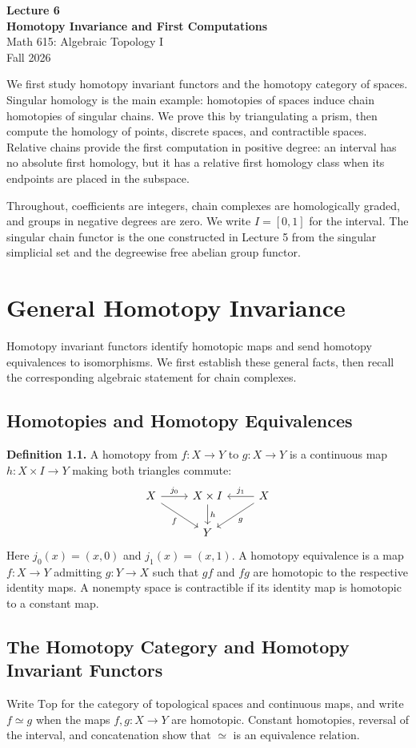 \documentclass[11pt]{article}
\newcommand{\facehead}[1]{\par\Needspace{4\baselineskip}\subsection{#1}}
\begin{document}
\begin{center}
{\Large\bfseries Lecture 6}\\[4pt]
{\LARGE\bfseries Homotopy Invariance and First Computations}\\[6pt]
Math 615: Algebraic Topology I\\Fall 2026
\end{center}
We first study homotopy invariant functors and the homotopy category of spaces. Singular homology is the main example: homotopies of spaces induce chain homotopies of singular chains. We prove this by triangulating a prism, then compute the homology of points, discrete spaces, and contractible spaces. Relative chains provide the first computation in positive degree: an interval has no absolute first homology, but it has a relative first homology class when its endpoints are placed in the subspace.

Throughout, coefficients are integers, chain complexes are homologically graded, and groups in negative degrees are zero. We write $I=[0,1]$ for the interval. The singular chain functor is the one constructed in Lecture 5 from the singular simplicial set and the degreewise free abelian group functor.
{\setlength{\parskip}{0pt}\small\tableofcontents}
\section{General Homotopy Invariance}\label{sec:definitions}
Homotopy invariant functors identify homotopic maps and send homotopy equivalences to isomorphisms. We first establish these general facts, then recall the corresponding algebraic statement for chain complexes.

\facehead{Homotopies and Homotopy Equivalences}
\textbf{Definition 1.1.} A homotopy from $f:X\to Y$ to $g:X\to Y$ is a continuous map $h:X\times I\to Y$ making both triangles commute:
\[
\begin{tikzcd}
X \arrow[r,"j_0"] \arrow[dr,"f"'] & X\times I \arrow[d,"h"] & X\arrow[l,"j_1"']\arrow[dl,"g"]\\
&Y&
\end{tikzcd}
\]
Here $j_0(x)=(x,0)$ and $j_1(x)=(x,1)$. A homotopy equivalence is a map $f:X\to Y$ admitting $g:Y\to X$ such that $gf$ and $fg$ are homotopic to the respective identity maps. A nonempty space is contractible if its identity map is homotopic to a constant map.

\facehead{The Homotopy Category and Homotopy Invariant Functors}
Write $\mathrm{Top}$ for the category of topological spaces and continuous maps, and write $f\simeq g$ when the maps $f,g:X\to Y$ are homotopic. Constant homotopies, reversal of the interval, and concatenation show that $\simeq$ is an equivalence relation.
\end{document}
